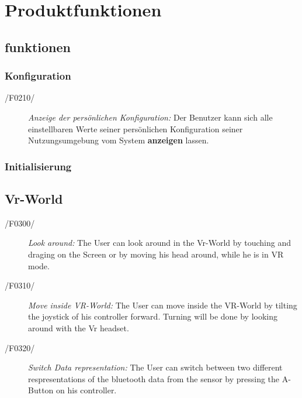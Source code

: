 \section{Produktfunktionen}

\subsection{funktionen}


\subsubsection{Konfiguration}

\begin{description}
  \item[/F0210/]
    \textit{Anzeige der persönlichen Konfiguration:}
    Der Benutzer kann sich alle einstellbaren Werte seiner persönlichen Konfiguration seiner Nutzungsumgebung vom System \textbf{anzeigen} lassen.
\end{description}

\subsubsection{Initialisierung}

\subsection{Vr-World}

\begin{description}
  \item[/F0300/]
    \textit{Look around:} The User can look around in the Vr-World by touching and draging on the Screen or by moving his head around, while he is in VR mode.
\end{description}

\begin{description}
  \item[/F0310/]
    \textit{Move inside VR-World:} The User can move inside the VR-World by tilting the joystick of his controller forward. Turning will be done by looking around with the Vr headset.
\end{description}

\begin{description}
  \item[/F0320/]
    \textit{Switch Data representation:} The User can switch between two different respresentations of the bluetooth data from the sensor by pressing the A-Button on his controller.
\end{description}

